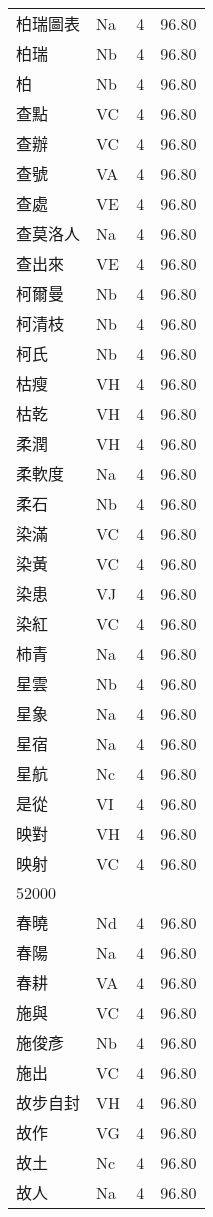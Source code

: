 \documentclass[twocolumn]{book}
\begin{document}
\begin{supertabular}{llrr}
柏瑞圖表 & Na & 4 &  96.80\\
柏瑞 & Nb & 4 &  96.80\\
柏 & Nb & 4 &  96.80\\
查點 & VC & 4 &  96.80\\
查辦 & VC & 4 &  96.80\\
查號 & VA & 4 &  96.80\\
查處 & VE & 4 &  96.80\\
查莫洛人 & Na & 4 &  96.80\\
查出來 & VE & 4 &  96.80\\
柯爾曼 & Nb & 4 &  96.80\\
柯清枝 & Nb & 4 &  96.80\\
柯氏 & Nb & 4 &  96.80\\
枯瘦 & VH & 4 &  96.80\\
枯乾 & VH & 4 &  96.80\\
柔潤 & VH & 4 &  96.80\\
柔軟度 & Na & 4 &  96.80\\
柔石 & Nb & 4 &  96.80\\
染滿 & VC & 4 &  96.80\\
染黃 & VC & 4 &  96.80\\
染患 & VJ & 4 &  96.80\\
染紅 & VC & 4 &  96.80\\
柿青 & Na & 4 &  96.80\\
星雲 & Nb & 4 &  96.80\\
星象 & Na & 4 &  96.80\\
星宿 & Na & 4 &  96.80\\
星航 & Nc & 4 &  96.80\\
是從 & VI & 4 &  96.80\\
映對 & VH & 4 &  96.80\\
映射 & VC & 4 &  96.80\\
52000\\
春曉 & Nd & 4 &  96.80\\
春陽 & Na & 4 &  96.80\\
春耕 & VA & 4 &  96.80\\
施與 & VC & 4 &  96.80\\
施俊彥 & Nb & 4 &  96.80\\
施出 & VC & 4 &  96.80\\
故步自封 & VH & 4 &  96.80\\
故作 & VG & 4 &  96.80\\
故土 & Nc & 4 &  96.80\\
故人 & Na & 4 &  96.80\\

\end{supertabular}
\end{document}
